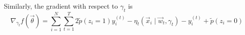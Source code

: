         Similarly, the gradient with respect to $\gamma_t$ is
        \[
            \nabla_{\gamma_t} f(\vec \theta) = \sum_{i = 1}^N \sum_{t = 1}^T
                    2 \tilde p(z_i = 1) y_i^{(t)}
                    - \eta_t(\vec x_i \mid \vec w_t, \gamma_t)
                    - y_i^{(t)}
                    + \tilde p(z_i = 0)
        \]


  
  


